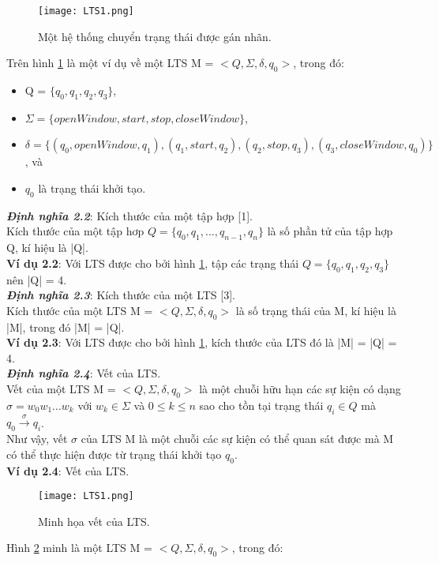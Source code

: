 \documentclass[a4paper,13pt,oneside,openany]{book}
\begin{document}
\begin{flushleft}
		\begin{figure}[h]
			\centering
			\texttt{[image: LTS1.png]}
			\caption{Một hệ thống chuyển trạng thái được gán nhãn.}
			\label{fig:LTS1}
		\end{figure}
		Trên hình \ref{fig:LTS1} là một ví dụ về một LTS M = $<Q, \Sigma, \delta, q_{0}>$, trong đó:
		\begin{itemize}
			\item Q = $\{q_0, q_1, q_2, q_3\}$,
			\item $\Sigma = \{openWindow, start, stop, closeWindow\}$,
			\item $\delta = \{(q_0, openWindow, q_1), (q_1, start, q_2), (q_2, stop, q_3), (q_3, closeWindow, q_0)\}$, và
			\item $q_0$ là trạng thái khởi tạo.
		\end{itemize}
		\textbf{\textit{Định nghĩa 2.2}}: Kích thước của một tập hợp [1].\\
		Kích thước của một tập hơp $Q = \{q_0, q_1, ..., q_{n-1}, q_n\}$ là số phần tử của tập hợp Q, kí hiệu là |Q|.\\
		\textbf{Ví dụ 2.2}: Với LTS được cho bởi hình \ref{fig:LTS1}, tập các trạng thái $Q = \{q_0, q_1, q_2, q_3\}$ nên |Q| = 4.\\
		\textbf{\textit{Định nghĩa 2.3}}: Kích thước của một LTS [3].\\
		Kích thước của một LTS M = $<Q, \Sigma, \delta, q_{0}>$ là số trạng thái của M, kí hiệu là |M|, trong đó |M| = |Q|.\\
		\textbf{Ví dụ 2.3}: Với LTS được cho bởi hình \ref{fig:LTS1}, kích thước của LTS đó là |M| = |Q| = 4.\\
		\textbf{\textit{Định nghĩa 2.4}}: Vết của LTS.\\
		Vết của một LTS M = $<Q, \Sigma, \delta, q_{0}>$ là một chuỗi hữu hạn các sự kiện có dạng $\sigma = w_0w_1...w_k$ với $w_k \in \Sigma$ và $0 \leq k \leq n$ sao cho tồn tại trạng thái $q_i \in Q$ mà $q_0 \overset{\sigma}{\longrightarrow} q_{i}$.\\
		Như vậy, vết $\sigma$ của LTS M là một chuỗi các sự kiện có thể quan sát được mà M có thể thực hiện được từ trạng thái khởi tạo $q_0$.\\
		\textbf{Ví dụ 2.4}: Vết của LTS.\\
		\begin{figure}[h]
			\centering
			\texttt{[image: LTS1.png]}
			\caption{Minh họa vết của LTS.}
			\label{fig:LTS2}
		\end{figure}
		Hình \ref{fig:LTS2} minh là một LTS M = $<Q, \Sigma, \delta, q_{0}>$, trong đó:

\end{flushleft}
\end{document}
